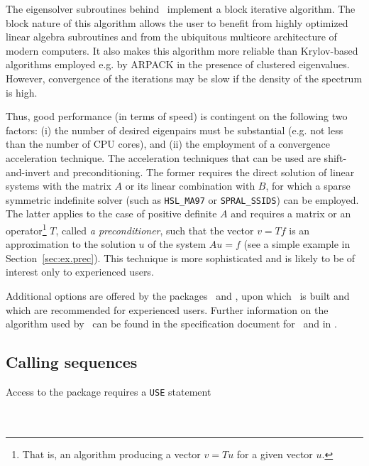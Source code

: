 \label{sec:summary}

The eigensolver subroutines
behind \fullpackagename\
implement a block iterative algorithm.
The block nature of this algorithm allows the user
to benefit from highly optimized linear algebra subroutines
and from the ubiquitous multicore architecture
of modern computers.
It also makes this algorithm more reliable
than Krylov-based algorithms employed e.g. by ARPACK
in the presence of clustered eigenvalues.
However, convergence of the iterations may be slow
if the density of the spectrum is high.

Thus, good performance 
(in terms of speed)
is contingent on the following two factors:
(i) the number of desired
eigenpairs must be substantial
(e.g. not less than the number of CPU cores),
and
(ii) the employment of a convergence acceleration technique.
The acceleration techniques that can be used 
are shift-and-invert and preconditioning.
The former requires
the direct solution of linear systems
with the matrix $A$ or its linear combination with $B$,
for which a sparse symmetric indefinite solver
(such as {\tt HSL\_MA97} or {\tt SPRAL\_SSIDS}) can be employed.
The latter applies to the case of positive definite $A$ and
requires a matrix or an operator\footnote{
That is, an algorithm producing a vector $v = T u$ for a given
vector $u$.
}
$T$, called {\em a preconditioner},
such that the vector
$v = T f$ is an approximation to the solution $u$
of the system $A u = f$
(see a simple example in Section~\ref{sec:ex.prec}).
This technique is more sophisticated
and is likely to be of interest only to experienced users.

Additional
options are offered by
the packages \advanced\ and \engine,
upon which \fullpackagename\ is built
and which are recommended for experienced users.
Further information on the algorithm used by
\fullpackagename\ can be found in the
specification document for \engine\
and in \report.

\subsection{Calling sequences}

\label{sec:call}

Access to the package requires a {\tt USE} statement \\ \\
\indent\hspace{8mm}{\tt use \fullpackagename} \\

